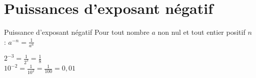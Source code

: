 \section{Puissances d'exposant négatif}
\begin{definition}{Puissance d'exposant négatif}
Pour tout nombre $a$ non nul et tout entier positif $n$ :
$a^{-n} = \frac{1}{a^n}$
\end{definition}

\begin{exemple}
$2^{-3} = \frac{1}{2^3} = \frac{1}{8}$\\
$10^{-2} = \frac{1}{10^2} = \frac{1}{100} = 0,01$
\end{exemple} 